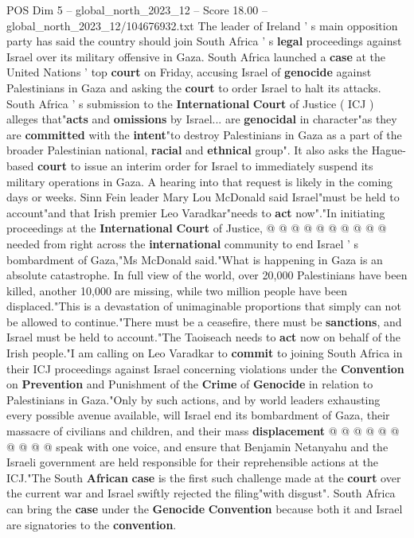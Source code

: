 \begin{textsample}{POS Dim 5 – global\_north\_2023\_12 – Score 18.00 – global\_north\_2023\_12/104676932.txt}  \label{ex:f5_pos_393}
The leader of Ireland ' s main opposition party has said the country should join South Africa ' s \textbf{legal} proceedings against Israel over its military offensive in Gaza.
South Africa launched a \textbf{case} at the United Nations ' top \textbf{court} on Friday, accusing Israel of \textbf{genocide} against Palestinians in Gaza and asking the \textbf{court} to order Israel to halt its attacks.
South Africa ' s submission to the \textbf{International} \textbf{Court} of Justice ( ICJ ) alleges that"\textbf{acts} and \textbf{omissions} by Israel... are \textbf{genocidal} in character"as they are \textbf{committed} with the \textbf{intent}"to destroy Palestinians in Gaza as a part of the broader Palestinian national, \textbf{racial} and \textbf{ethnical} group".
It also asks the Hague-based \textbf{court} to issue an interim order for Israel to immediately suspend its military operations in Gaza.
A hearing into that request is likely in the coming days or weeks.
Sinn Fein leader Mary Lou McDonald said Israel"must be held to account"and that Irish premier Leo Varadkar"needs to \textbf{act} now"."In initiating proceedings at the \textbf{International} \textbf{Court} of Justice, @ @ @ @ @ @ @ @ @ @ needed from right across the \textbf{international} community to end Israel ' s bombardment of Gaza,"Ms McDonald said."What is happening in Gaza is an absolute catastrophe.
In full view of the world, over 20,000 Palestinians have been killed, another 10,000 are missing, while two million people have been displaced."This is a devastation of unimaginable proportions that simply can not be allowed to continue."There must be a ceasefire, there must be \textbf{sanctions}, and Israel must be held to account."The Taoiseach needs to \textbf{act} now on behalf of the Irish people."I am calling on Leo Varadkar to \textbf{commit} to joining South Africa in their ICJ proceedings against Israel concerning violations under the \textbf{Convention} on \textbf{Prevention} and Punishment of the \textbf{Crime} of \textbf{Genocide} in relation to Palestinians in Gaza."Only by such actions, and by world leaders exhausting every possible avenue available, will Israel end its bombardment of Gaza, their massacre of civilians and children, and their mass \textbf{displacement} @ @ @ @ @ @ @ @ @ @ speak with one voice, and ensure that Benjamin Netanyahu and the Israeli government are held responsible for their reprehensible actions at the ICJ."The South \textbf{African} \textbf{case} is the first such challenge made at the \textbf{court} over the current war and Israel swiftly rejected the filing"with disgust".
South Africa can bring the \textbf{case} under the \textbf{Genocide} \textbf{Convention} because both it and Israel are signatories to the \textbf{convention}.

\end{textsample}
